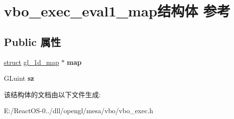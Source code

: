 \hypertarget{structvbo__exec__eval1__map}{}\section{vbo\+\_\+exec\+\_\+eval1\+\_\+map结构体 参考}
\label{structvbo__exec__eval1__map}
\subsection*{Public 属性}
\begin{DoxyCompactItemize}
\item 
\mbox{\label{structvbo__exec__eval1__map_a17343a18be31178fb0f233a17cda5d2e}} 
\hyperlink{interfacestruct}{struct} \hyperlink{structgl__1d__map}{gl\+\_\+1d\+\_\+map} $\ast$ {\bfseries map}
\item 
\mbox{\label{structvbo__exec__eval1__map_a40174898e09bcd2cca93558e2d3fb183}} 
G\+Luint {\bfseries sz}
\end{DoxyCompactItemize}


该结构体的文档由以下文件生成\+:\begin{DoxyCompactItemize}
\item 
E\+:/\+React\+O\+S-\/0../dll/opengl/mesa/vbo/vbo\+\_\+exec.\+h\end{DoxyCompactItemize}
